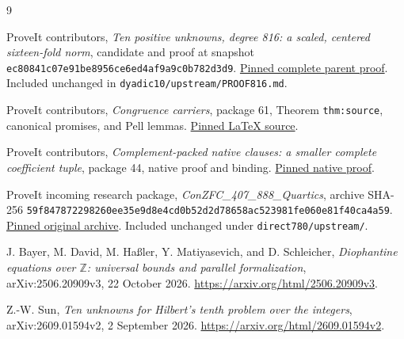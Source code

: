 \documentclass[11pt,letterpaper]{article}
\newcommand{\Z}{\mathbb Z}
\newcommand{\sha}{\texttt{ec80841c07e91be8956ce6ed4af9a9c0b782d3d9}}
\theoremstyle{definition}
\theoremstyle{remark}
\numberwithin{equation}{section}
\begin{document}
\begin{thebibliography}{9}
\small\raggedright
{}
ProveIt contributors, \emph{Ten positive unknowns, degree 816: a scaled,
centered sixteen-fold norm}, candidate and proof at snapshot \sha.
\href{https://github.com/VladimirReshetnikov/ProveIt/blob/ec80841c07e91be8956ce6ed4af9a9c0b782d3d9/Computability/DiophantineConsistency/candidates/ten-positive-scaled-norm/PROOF.md}
{Pinned complete parent proof}. Included unchanged in
\texttt{dyadic10/upstream/PROOF816.md}.

ProveIt contributors, \emph{Congruence carriers}, package 61,
Theorem \texttt{thm:source}, canonical promises, and Pell lemmas.
\href{https://github.com/VladimirReshetnikov/ProveIt/blob/ec80841c07e91be8956ce6ed4af9a9c0b782d3d9/Computability/DiophantineConsistency/con-zfc-diophantine-forms/61-congruence-carriers/report/congruence_carriers.tex}
{Pinned LaTeX source}.

ProveIt contributors, \emph{Complement-packed native clauses: a smaller
complete coefficient tuple}, package 44, native proof and binding.
\href{https://github.com/VladimirReshetnikov/ProveIt/blob/ec80841c07e91be8956ce6ed4af9a9c0b782d3d9/Computability/DiophantineConsistency/con-zfc-diophantine-forms/44-b4-sparse/native/PROOF.md}
{Pinned native proof}.

ProveIt incoming research package, \emph{ConZFC\_407\_888\_Quartics},
archive SHA-256
\texttt{59f847872298260ee35e9d8e4cd0b52d2d78658ac523981fe060e81f40ca4a59}.
\href{https://github.com/VladimirReshetnikov/ProveIt/blob/ec80841c07e91be8956ce6ed4af9a9c0b782d3d9/docs/incoming/ConZFC_407_888_Quartics_2026-10-24.zip}
{Pinned original archive}. Included unchanged under \texttt{direct780/upstream/}.

J. Bayer, M. David, M. Ha\ss ler, Y. Matiyasevich, and D. Schleicher,
\emph{Diophantine equations over $\Z$: universal bounds and parallel
formalization}, arXiv:2506.20909v3, 22 October 2026.
\url{https://arxiv.org/html/2506.20909v3}.

Z.-W. Sun, \emph{Ten unknowns for Hilbert's tenth problem over the
integers}, arXiv:2609.01594v2, 2 September 2026.
\url{https://arxiv.org/html/2609.01594v2}.
\end{thebibliography}
\end{document}
